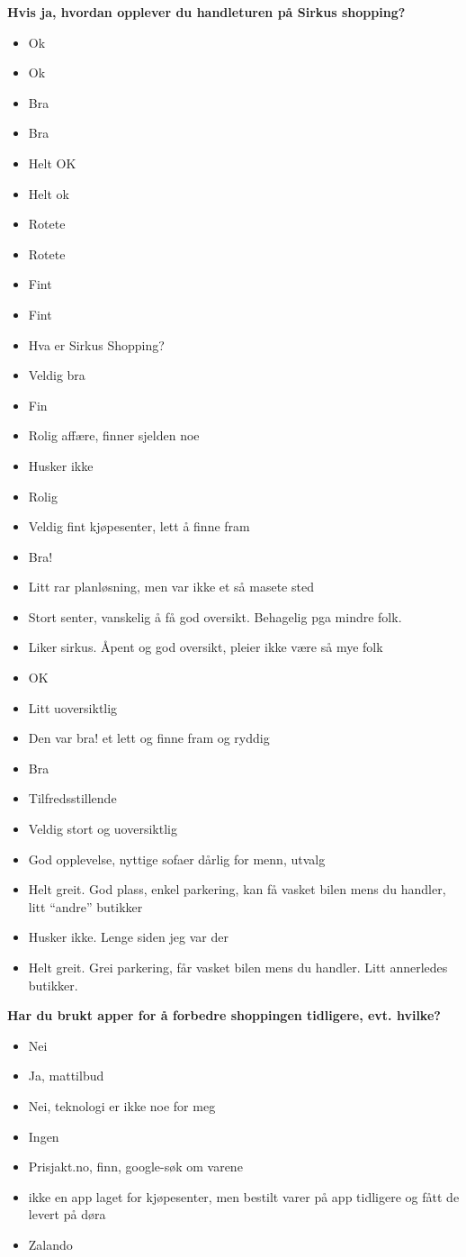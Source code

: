 \noindent \large{\textbf{Hvis ja, hvordan opplever du handleturen på Sirkus shopping?}}
\begin{itemize}
    \item Ok
    \item Ok
    \item Bra
    \item Bra
    \item Helt OK
    \item Helt ok
    \item Rotete
    \item Rotete
    \item Fint
    \item Fint
    \item Hva er Sirkus Shopping?
    \item Veldig bra
    \item Fin
    \item Rolig affære, finner sjelden noe
    \item Husker ikke
    \item Rolig
    \item Veldig fint kjøpesenter, lett å finne fram
    \item Bra!
    \item Litt rar planløsning, men var ikke et så masete sted
    \item Stort senter, vanskelig å få god oversikt. Behagelig pga mindre folk.
    \item Liker sirkus. Åpent og god oversikt, pleier ikke være så mye folk
    \item OK
    \item Litt uoversiktlig
    \item Den var bra! et lett og finne fram og ryddig
    \item Bra
    \item Tilfredsstillende
    \item Veldig stort og uoversiktlig
    \item God opplevelse, nyttige sofaer dårlig for menn, utvalg
    \item Helt greit. God plass, enkel parkering, kan få vasket bilen mens du handler, litt “andre” butikker
    \item Husker ikke. Lenge siden jeg var der
    \item Helt greit. Grei parkering, får vasket bilen mens du handler. Litt annerledes butikker.
\end{itemize}

\noindent \large{\textbf{Har du brukt apper for å forbedre shoppingen tidligere, evt. hvilke?}}
\begin{itemize}
    \item Nei
    \item Ja, mattilbud
    \item Nei, teknologi er ikke noe for meg
    \item Ingen
    \item Prisjakt.no, finn, google-søk om varene
    \item ikke en app laget for kjøpesenter, men bestilt varer på app tidligere og fått de levert på døra
    \item Zalando
\end{itemize}

